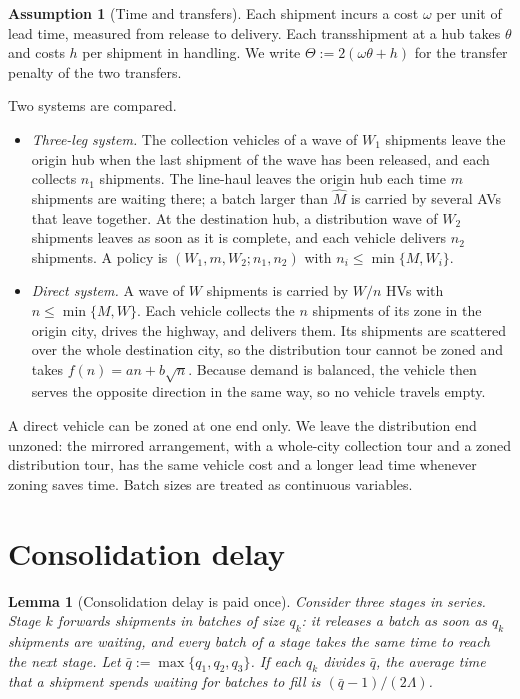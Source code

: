 \documentclass[10pt, reqno]{amsart}
\newtheorem{lemma}[proposition]{Lemma}
\theoremstyle{definition}
\newtheorem{assumption}{Assumption}
\begin{document}
\begin{assumption}[Time and transfers]\label{as:time}
Each shipment incurs a cost $\omega$ per unit of lead time, measured from release to delivery. Each transshipment at a hub takes $\theta$ and costs $h$ per shipment in handling. We write $\Theta := 2(\omega\theta+h)$ for the transfer penalty of the two transfers.
\end{assumption}

Two systems are compared.
\begin{itemize}
\item \emph{Three-leg system.} The collection vehicles of a wave of $W_1$ shipments leave the origin hub when the last shipment of the wave has been released, and each collects $n_1$ shipments. The line-haul leaves the origin hub each time $m$ shipments are waiting there; a batch larger than $\hat M$ is carried by several AVs that leave together. At the destination hub, a distribution wave of $W_2$ shipments leaves as soon as it is complete, and each vehicle delivers $n_2$ shipments. A policy is $(W_1,m,W_2;n_1,n_2)$ with $n_i\le\min\{M,W_i\}$.
\item \emph{Direct system.} A wave of $W$ shipments is carried by $W/n$ HVs with $n\le\min\{M,W\}$. Each vehicle collects the $n$ shipments of its zone in the origin city, drives the highway, and delivers them. Its shipments are scattered over the whole destination city, so the distribution tour cannot be zoned and takes $f(n)=an+b\sqrt n$. Because demand is balanced, the vehicle then serves the opposite direction in the same way, so no vehicle travels empty.
\end{itemize}
A direct vehicle can be zoned at one end only. We leave the distribution end unzoned: the mirrored arrangement, with a whole-city collection tour and a zoned distribution tour, has the same vehicle cost and a longer lead time whenever zoning saves time. Batch sizes are treated as continuous variables.

\section{Consolidation delay}

\begin{lemma}[Consolidation delay is paid once]\label{lem:delay}
Consider three stages in series. Stage $k$ forwards shipments in batches of size $q_k$: it releases a batch as soon as $q_k$ shipments are waiting, and every batch of a stage takes the same time to reach the next stage. Let $\bar q:=\max\{q_1,q_2,q_3\}$. If each $q_k$ divides $\bar q$, the average time that a shipment spends waiting for batches to fill is $(\bar q-1)/(2\Lambda)$.
\end{lemma}
\end{document}
